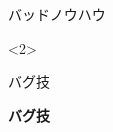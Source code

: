 %
%

\begin{frame}[plain]{}
  \begin{center}
    {\hhhuge \color{mybad}バッドノウハウ}%
    \begin{visibleenv}<2>
    {\hhhhuge \fntPixel{}}%
    \end{visibleenv}
  \end{center}
\end{frame}
\begin{frame}[plain]{}
    {\hhhhuge \fntPixel\alert{バグ技}}%
\end{frame}
\begin{frame}[plain]{}
    {\hhhhuge \fntPixel\bfseries\alert{バグ技}}%
\end{frame}

